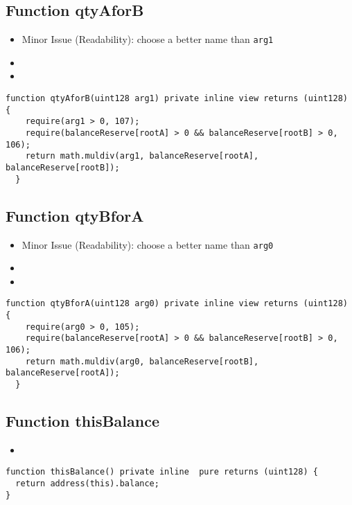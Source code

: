 \subsection{Function qtyAforB}

\begin{itemize}
\item Minor Issue (Readability): choose a better name than {\tt arg1}
\item \issueError{}
\item \issueInternal
\end{itemize}

\begin{lstlisting}[firstnumber=184]
  function qtyAforB(uint128 arg1) private inline view returns (uint128) {
    require(arg1 > 0, 107);
    require(balanceReserve[rootA] > 0 && balanceReserve[rootB] > 0, 106);
    return math.muldiv(arg1, balanceReserve[rootA], balanceReserve[rootB]);
  }
\end{lstlisting}

\subsection{Function qtyBforA}

\begin{itemize}
\item Minor Issue (Readability): choose a better name than {\tt arg0}
\item \issueError{}
\item \issueInternal
\end{itemize}

\begin{lstlisting}[firstnumber=177]
  function qtyBforA(uint128 arg0) private inline view returns (uint128) {
    require(arg0 > 0, 105);
    require(balanceReserve[rootA] > 0 && balanceReserve[rootB] > 0, 106);
    return math.muldiv(arg0, balanceReserve[rootB], balanceReserve[rootA]);
  }
\end{lstlisting}

\subsection{Function thisBalance}

\begin{itemize}
\item \issueInternal
\end{itemize}

\begin{lstlisting}[firstnumber=599]
function thisBalance() private inline  pure returns (uint128) {
  return address(this).balance;
}
\end{lstlisting}
